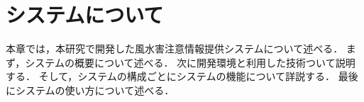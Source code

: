 \documentclass[a4paper,11pt,oneside,openany]{jsbook}
\begin{document}
\chapter{システムについて}
本章では，本研究で開発した風水害注意情報提供システムについて述べる．
まず，システムの概要について述べる．
次に開発環境と利用した技術ついて説明する．
そして，システムの構成ごとにシステムの機能について詳説する．
最後にシステムの使い方について述べる．






%
\end{document}
